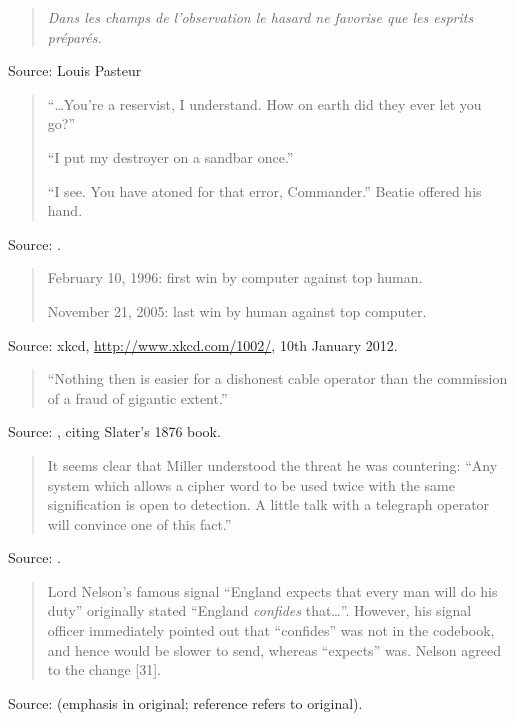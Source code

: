 \documentclass[a4paper]{article}
\begin{document}
\begin{quote}
	{\it Dans les champs de l'observation le hasard ne favorise que les esprits pr\'epar\'es.}
\end{quote}
Source: Louis Pasteur
\medskip

\begin{quote}
	``\ldots You're a reservist, I understand.  How on earth did they ever let you go?''

	``I put my destroyer on a sandbar once.''

	``I see.  You have atoned for that error, Commander.''  Beatie offered his hand.
\end{quote}
Source: \citet[p.~505]{Clancy1986}.
\medskip

\begin{quote}
	February 10, 1996: first win by computer against top human.

	November 21, 2005: last win by human against top computer.
\end{quote}
Source: xkcd, \url{http://www.xkcd.com/1002/}, 10th January 2012.
\medskip

\begin{quote}
	``Nothing then is easier for a dishonest cable operator than the commission of a fraud of
gigantic extent.''
\end{quote}
Source: \citet[p.~210]{Bellovin2011}, citing Slater's 1876 book.
\medskip

\begin{quote}
	It seems clear that Miller understood the threat he was countering: ``Any system which allows a
cipher word to be used twice with the same signification is open to detection.  A little talk with
a telegraph operator will convince one of this fact.''
\end{quote}
Source: \citet[p.~210]{Bellovin2011}.
\medskip

\begin{quote}
	Lord Nelson's famous signal ``England expects that every man will do his duty'' originally
stated ``England \emph{confides} that\ldots''.  However, his signal officer immediately pointed out
that ``confides'' was not in the codebook, and hence would be slower to send, whereas ``expects''
was.  Nelson agreed to the change [31].
\end{quote}
Source: \citet[p.~208]{Bellovin2011} (emphasis in original; reference refers to original).
\medskip
\end{document}
